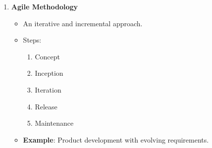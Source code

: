 \documentclass[aspectratio=169]{beamer}
\begin{document}
\begin{frame}[fragile]
\begin{enumerate}
        \item \textbf{Agile Methodology}
            \begin{itemize}
                \item An iterative and incremental approach.
                \item Steps:
                    \begin{enumerate}
                        \item Concept
                        \item Inception
                        \item Iteration
                        \item Release
                        \item Maintenance
                    \end{enumerate}
                \item \textbf{Example}: Product development with evolving requirements.
            \end{itemize}
    \end{enumerate}
\end{frame}
\end{document}
